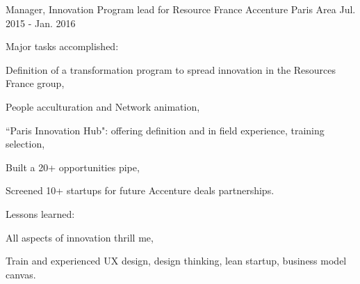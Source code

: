 \begin{cventries}
  \cventry
    {Manager, Innovation Program lead for Resource France} %
    {Accenture} %
    {Paris Area} %
    {Jul. 2015 - Jan. 2016} %
    {
      \begin{cvitems} %
        \item {Major tasks accomplished:}
        \begin{cvsubitems}
          \item {Definition of a transformation program to spread innovation in the Resources France group,}
          \item {People acculturation and Network animation,}
          \item {``Paris Innovation Hub": offering definition and in field experience, training selection,}
          \item {Built a 20+ opportunities pipe,}
          \item {Screened 10+ startups for future Accenture deals partnerships.}
        \end{cvsubitems}
        \item {Lessons learned:}
        \begin{cvsubitems}
          \item {All aspects of innovation thrill me,}
          \item {Train and experienced UX design, design thinking, lean startup, business model canvas.}
        \end{cvsubitems}
      \end{cvitems}
    }


\end{cventries}
